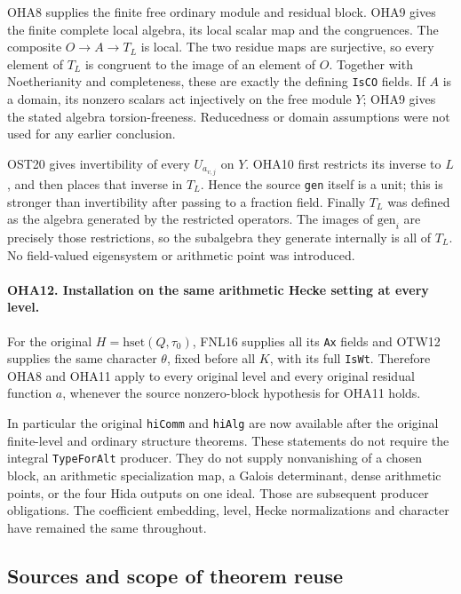 OHA8 supplies the finite free ordinary module and residual block.
OHA9 gives the finite complete local algebra, its local scalar
map and the congruences. The composite \(O\to A\to T_L\) is
local. The two residue maps are surjective, so every element
of \(T_L\) is congruent to the image of an element of \(O\).
Together with Noetherianity and completeness, these are
exactly the defining \texttt{IsCO} fields. If \(A\) is a domain,
its nonzero scalars act injectively on the free module \(Y\);
OHA9 gives the stated algebra torsion-freeness. Reducedness or
domain assumptions were not used for any earlier conclusion.

OST20 gives invertibility of every \(U_{a_{v,j}}\) on \(Y\).
OHA10 first restricts its inverse to \(L\), and then places that
inverse in \(T_L\). Hence the source \texttt{gen} itself is a
unit; this is stronger than invertibility after passing to a
fraction field. Finally \(T_L\) was defined as the algebra
generated by the restricted operators. The images of
\(\mathrm{gen}_i\) are precisely those restrictions, so the
subalgebra they generate internally is all of \(T_L\).
No field-valued eigensystem or arithmetic point was introduced.

\paragraph{OHA12. Installation on the same arithmetic Hecke setting at every level.}
\label{claim:OHA12}
For the original \(H=\mathrm{hset}(Q,\tau_0)\), FNL16 supplies
all its \texttt{Ax} fields and OTW12 supplies the same character
\(\theta\), fixed before all \(K\), with its full
\texttt{IsWt}. Therefore OHA8 and OHA11 apply to every original
level and every original residual function \(a\), whenever the
source nonzero-block hypothesis for OHA11 holds.

In particular the original \texttt{hiComm} and \texttt{hiAlg}
are now available after the original finite-level and ordinary
structure theorems. These statements do not require the
integral \texttt{TypeForAlt} producer. They do not supply
nonvanishing of a chosen block, an arithmetic specialization
map, a Galois determinant, dense arithmetic points, or the
four Hida outputs on one ideal. Those are subsequent producer
obligations. The coefficient embedding, level, Hecke
normalizations and character have remained the same throughout.

\subsection{Sources and scope of theorem reuse}

